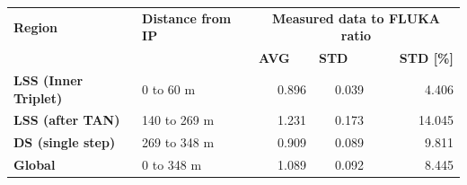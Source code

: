 \documentclass[encoding=utf8,british]{tumphthesis}
\begin{document}
\begin{table}[H]
\begin{subtable}{1.0\textwidth}
\begin{tabular}{|l|l|rrr|}
\hline
\rowcolor[HTML]{CFE2F3} 
\textbf{Region}              & \textbf{Distance from IP} & \multicolumn{3}{c|}{\cellcolor[HTML]{CFE2F3}\textbf{Measured data to FLUKA ratio}}                                             \\
                             &               & \multicolumn{1}{l}{\textbf{AVG}} & \multicolumn{1}{l}{\textbf{STD}} & \multicolumn{1}{r|}{\textbf{STD {[}\%{]}}} \\ \hline
\rowcolor[HTML]{CFE2F3} 
\textbf{LSS (Inner Triplet)} & 0 to 60 m     & 0.896                             & 0.039                            & 4.406                                     \\
\textbf{LSS (after TAN)}     & 140 to 269 m  & 1.231                             & 0.173                            & 14.045                                    \\
\rowcolor[HTML]{CFE2F3} 
\textbf{DS (single step)}    & 269 to 348 m  & 0.909                             & 0.089                            & 9.811                                     \\ \hline
\textbf{Global}              & 0 to 348 m    & 1.089                             & 0.092                            & 8.445                                     \\ \hline
\end{tabular}
\end{subtable}

    \bigskip

    \hfill

    \begin{subtable}{1.0\textwidth}
    \centering
    \label{tab:agreement-levels-BLMs-2018-ip5}


\end{subtable}
\end{table}
\end{document}
